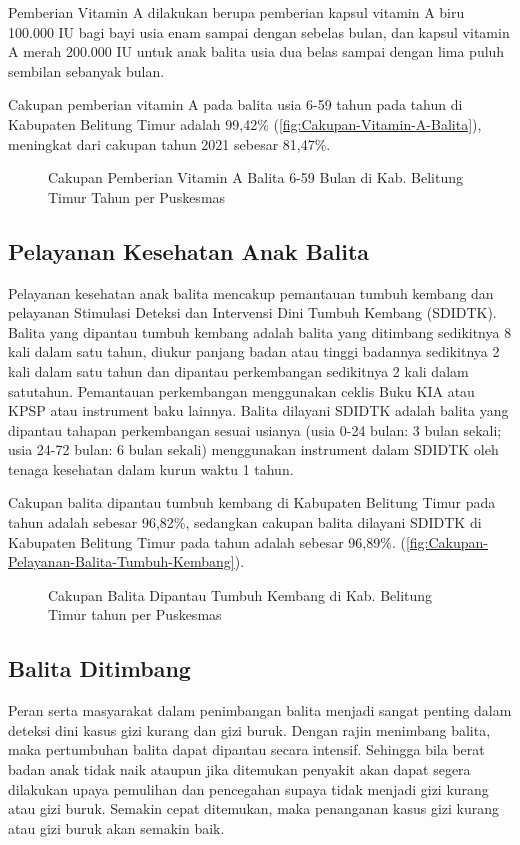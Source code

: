 Pemberian Vitamin A dilakukan berupa pemberian kapsul vitamin A biru 100.000 IU bagi bayi
usia enam sampai dengan sebelas bulan, dan kapsul vitamin A merah 200.000
IU untuk anak balita usia dua belas sampai dengan lima puluh sembilan sebanyak
bulan.

Cakupan pemberian vitamin A pada balita usia 6-59 tahun pada tahun \tP di Kabupaten Belitung Timur adalah 99,42\% (\autoref{fig:Cakupan-Vitamin-A-Balita}), meningkat dari cakupan tahun 2021 sebesar 81,47\%.

\begin{figure}[H]
    \centering
    \caption{Cakupan Pemberian Vitamin A Balita 6-59 Bulan di Kab. Belitung Timur Tahun \tP per Puskesmas}
    \label{fig:Cakupan-Vitamin-A-Balita}
\end{figure}


\subsection{Pelayanan Kesehatan Anak Balita}
Pelayanan kesehatan anak balita mencakup pemantauan tumbuh kembang dan pelayanan Stimulasi Deteksi dan Intervensi Dini Tumbuh Kembang (SDIDTK).
Balita yang dipantau tumbuh kembang adalah  balita yang ditimbang sedikitnya 8 kali dalam satu tahun, diukur panjang badan atau tinggi badannya sedikitnya 2 kali dalam satu tahun dan dipantau perkembangan sedikitnya 2 kali dalam satutahun. Pemantauan perkembangan menggunakan ceklis Buku KIA atau KPSP atau instrument baku lainnya.
Balita dilayani SDIDTK adalah balita yang dipantau tahapan perkembangan sesuai usianya (usia 0-24 bulan: 3 bulan sekali; usia 24-72 bulan: 6 bulan sekali) menggunakan instrument dalam SDIDTK oleh tenaga kesehatan dalam kurun waktu 1 tahun.

Cakupan balita dipantau tumbuh kembang di Kabupaten Belitung Timur pada tahun \tP adalah sebesar 96,82\%, sedangkan cakupan balita dilayani SDIDTK di Kabupaten Belitung Timur pada tahun \tP adalah sebesar 96,89\%. (\autoref{fig:Cakupan-Pelayanan-Balita-Tumbuh-Kembang}).

\begin{figure}[H]
	\centering
	\caption{Cakupan Balita Dipantau Tumbuh Kembang di Kab. Belitung Timur tahun \tP per Puskesmas}
	\label{fig:Cakupan-Pelayanan-Balita-Tumbuh-Kembang}
\end{figure}

\subsection{Balita Ditimbang}
\label{subsec:Balita-Ditimbang}
Peran serta masyarakat dalam penimbangan balita menjadi sangat penting
dalam deteksi dini kasus gizi kurang dan gizi buruk. Dengan rajin
menimbang balita, maka pertumbuhan balita dapat dipantau secara intensif.
Sehingga bila berat badan anak tidak naik ataupun jika ditemukan penyakit
akan dapat segera dilakukan upaya pemulihan dan pencegahan supaya
tidak menjadi gizi kurang atau gizi buruk. Semakin cepat ditemukan,
maka penanganan kasus gizi kurang atau gizi buruk akan semakin baik.\par

